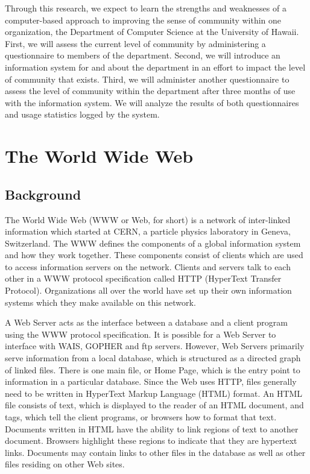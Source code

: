 
Through this research, we expect to learn the strengths and weaknesses of a
computer-based approach to improving the sense of community within one
organization, the Department of Computer Science at the University of
Hawaii.  First, we will assess the current level of community by
administering a questionnaire to members of the department.  Second, we
will introduce an information system for and about the department in an
effort to impact the level of community that exists.  Third, we will
administer another questionnaire to assess the level of community within
the department after three months of use with the information system.  We
will analyze the results of both questionnaires and usage statistics logged
by the system.

\section{The World Wide Web}

\subsection{Background}
The World Wide Web (WWW or Web, for short) is a network of inter-linked
information which started at CERN, a particle physics laboratory in Geneva,
Switzerland.  The WWW defines the components of a global information system
and how they work together.  These components consist of clients which are
used to access information servers on the network.  Clients and servers
talk to each other in a WWW protocol specification called HTTP (HyperText
Transfer Protocol).  Organizations all over the world have set up their own
information systems which they make available on this network.

A Web Server acts as the interface between a database and a client program
using the WWW protocol specification.  It is possible for a Web Server to
interface with WAIS, GOPHER and ftp servers.  However, Web Servers
primarily serve information from a local database, which is structured as a
directed graph of linked files.  There is one main file, or Home Page,
which is the entry point to information in a particular database.  Since
the Web uses HTTP, files generally need to be written in HyperText Markup
Language (HTML) format.  An HTML file consists of text, which is displayed
to the reader of an HTML document, and tags, which tell the client
programs, or browsers how to format that text.  Documents written in HTML
have the ability to link regions of text to another document. Browsers
highlight these regions to indicate that they are hypertext links.
Documents may contain links to other files in the database as well as other
files residing on other Web sites.

